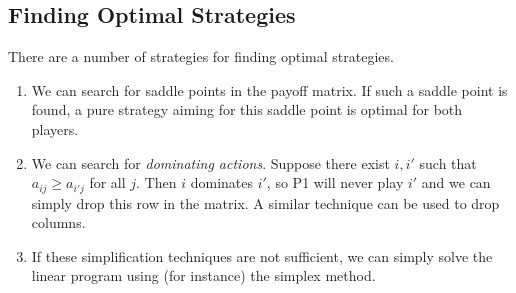 \subsection{Finding Optimal Strategies}
There are a number of strategies for finding optimal strategies.
\begin{enumerate}
	\item We can search for saddle points in the payoff matrix.
	      If such a saddle point is found, a pure strategy aiming for this saddle point is optimal for both players.
	\item We can search for \textit{dominating actions}.
	      Suppose there exist \( i, i' \) such that \( a_{ij} \geq a_{i'j} \) for all \( j \).
	      Then \( i \) dominates \( i' \), so P1 will never play \( i' \) and we can simply drop this row in the matrix.
	      A similar technique can be used to drop columns.
	\item If these simplification techniques are not sufficient, we can simply solve the linear program using (for instance) the simplex method.
\end{enumerate}
